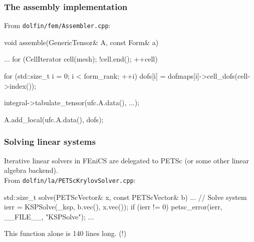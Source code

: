 \documentclass{fenicscourse}
\begin{document}
\begin{frame}[fragile,shrink=10]
  \frametitle{The assembly implementation}

  \bigskip

  From \texttt{dolfin/fem/Assembler.cpp}:

  \bigskip

\begin{c++}
void assemble(GenericTensor& A, const Form& a)
{
  ...
  for (CellIterator cell(mesh); !cell.end(); ++cell)
  {
    for (std::size_t i = 0; i < form_rank; ++i)
      dofs[i] = dofmaps[i]->cell_dofs(cell->index());

    integral->tabulate_tensor(ufc.A.data(), ...);

    A.add_local(ufc.A.data(), dofs);
  }
}
\end{c++}

\end{frame}



\begin{frame}[fragile]
  \frametitle{Solving linear systems}

  Iterative linear solvers in FEniCS are delegated to PETSc (or some
  other linear algebra backend).\\[1em]

  From \texttt{dolfin/la/PETScKrylovSolver.cpp}:

\begin{c++}
std::size_t solve(PETScVector& x,
                  const PETScVector& b)
{
  ...
  // Solve system
  ierr =  KSPSolve(_ksp, b.vec(), x.vec());
  if (ierr != 0) petsc_error(ierr, __FILE__, "KSPSolve");
  ...
}
\end{c++}

This function alone is 140 lines long. (!)
\end{frame}
\end{document}
